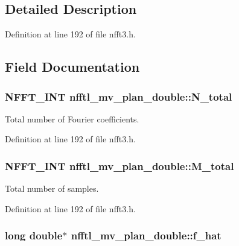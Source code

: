 \subsection{Detailed Description}


Definition at line 192 of file nfft3.\-h.



\subsection{Field Documentation}
\hypertarget{structnfftl__mv__plan__double_abd421e5b3a95756044f9d392546ca238}{
\subsubsection[{N\-\_\-total}]{\setlength{\rightskip}{0pt plus 5cm}N\-F\-F\-T\-\_\-\-I\-N\-T nfftl\-\_\-mv\-\_\-plan\-\_\-double\-::\-N\-\_\-total}}\label{structnfftl__mv__plan__double_abd421e5b3a95756044f9d392546ca238}


Total number of Fourier coefficients. 



Definition at line 192 of file nfft3.\-h.

\hypertarget{structnfftl__mv__plan__double_ab3cee398386f6d47f5ef9adc87ba860e}{
\subsubsection[{M\-\_\-total}]{\setlength{\rightskip}{0pt plus 5cm}N\-F\-F\-T\-\_\-\-I\-N\-T nfftl\-\_\-mv\-\_\-plan\-\_\-double\-::\-M\-\_\-total}}\label{structnfftl__mv__plan__double_ab3cee398386f6d47f5ef9adc87ba860e}


Total number of samples. 



Definition at line 192 of file nfft3.\-h.

\hypertarget{structnfftl__mv__plan__double_add804289931e55388070ee495c3e5072}{
\subsubsection[{f\-\_\-hat}]{\setlength{\rightskip}{0pt plus 5cm}long double$\ast$ nfftl\-\_\-mv\-\_\-plan\-\_\-double\-::f\-\_\-hat}}\label{structnfftl__mv__plan__double_add804289931e55388070ee495c3e5072}


